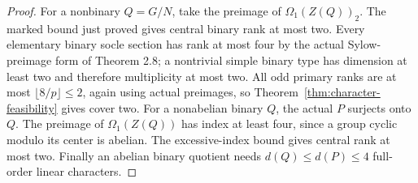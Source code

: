 \begin{proof}
For a nonbinary $Q=G/N$, take the preimage of
$\Omega_1(Z(Q))_2$. The marked bound just proved gives central
binary rank at most two. Every elementary binary socle section has
rank at most four by the actual Sylow-preimage form of Theorem 2.8;
a nontrivial simple binary type has dimension at least two and
therefore multiplicity at most two. All odd primary ranks are at
most $\lfloor8/p\rfloor\leq2$, again using actual preimages, so
Theorem~\ref{thm:character-feasibility} gives cover two.
For a nonabelian binary $Q$, the actual $P$ surjects onto $Q$.
The preimage of $\Omega_1(Z(Q))$ has index at least four, since a
group cyclic modulo its center is abelian. The excessive-index
bound gives central rank at most two. Finally an abelian binary
quotient needs $d(Q)\leq d(P)\leq4$ full-order linear characters.
\end{proof}

